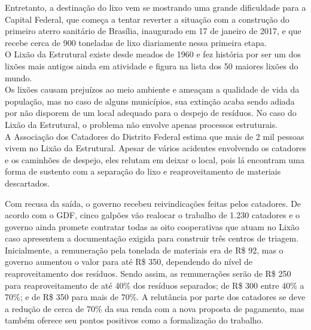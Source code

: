 Entretanto, a destinação do lixo vem se mostrando uma grande dificuldade para a Capital Federal, que começa a tentar reverter a situação com a construção do primeiro aterro sanitário de Brasília, inaugurado em 17 de janeiro de 2017, e que recebe cerca de 900 toneladas de lixo diariamente nessa primeira etapa.\\

O Lixão da Estrutural existe desde meados de 1960 e fez história por ser um dos lixões mais antigos ainda em atividade e figura na lista dos 50 maiores lixões do mundo.\\

Os lixões causam prejuízos ao meio ambiente e ameaçam a qualidade de vida da população, mas no caso de alguns municípios, sua extinção acaba sendo adiada por não disporem de um local adequado para o despejo de resíduos. No caso do Lixão da Estrutural, o problema não envolve apenas processos estruturais.\\

A Associação dos Catadores do Distrito Federal estima que mais de 2 mil pessoas vivem no Lixão da Estrutural. Apesar de vários acidentes envolvendo os catadores e os caminhões de despejo, eles relutam em deixar o local, pois lá encontram uma forma de sustento com a separação do lixo e reaproveitamento de materiais descartados.

Com recusa da saída, o governo recebeu reivindicações feitas pelos catadores. De acordo com o GDF, cinco galpões vão realocar o trabalho de 1.230 catadores e o governo ainda promete contratar todas as oito cooperativas que atuam no Lixão caso apresentem a documentação exigida para construir três centros de triagem.\\

Inicialmente, a remuneração pela tonelada de materiais era de R\$ 92, mas o governo aumentou o valor para até R\$ 350, dependendo do nível de reaproveitamento dos resíduos. Sendo assim, as remunerações serão de R\$ 250 para reaproveitamento de até 40\% dos resíduos separados; de R\$ 300 entre 40\% a 70\%; e de R\$ 350 para mais de 70\%. A relutância por parte dos catadores se deve a redução de cerca de 70\% da sua renda com a nova proposta de pagamento, mas  também oferece seu pontos positivos como a formalização do trabalho. \nocite{CidadesInteligentes2018Lixao}